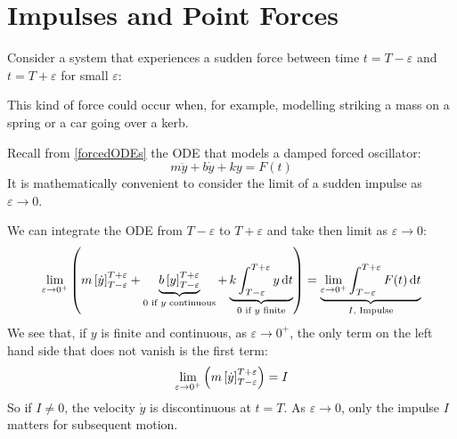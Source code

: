 \documentclass[../main.tex]{subfiles}
\begin{document}
\section{Impulses and Point Forces}
Consider a system that experiences a sudden force between time $t = T - \varepsilon$ and $t = T + \varepsilon$ for small $\varepsilon$:
\begin{center}
\end{center}
This kind of force could occur when, for example, modelling striking a mass on a spring or a car going over a kerb.
\begin{example}
  \label{impulseExample}
  Recall from \cref{forcedODEs} the ODE that models a damped forced oscillator:
  \[
    m\ddot{y} + b\dot{y} + ky = F(t)
  \]
  It is mathematically convenient to consider the limit of a sudden impulse as $\varepsilon \to 0$.

  We can integrate the ODE from $T - \varepsilon$ to $T + \varepsilon$ and take then limit as $\varepsilon \to 0$:
  \[
    \lim_{\varepsilon \to 0^{+}} \left(m \eval{\dot{y}}{T - \varepsilon}{T + \varepsilon} + \underbrace{b \eval{y}{T - \varepsilon}{T+\varepsilon}}_{0 \text{ if $y$ continuous}} + \underbrace{k \int_{T-\varepsilon}^{T+\varepsilon} y \d{t}}_{0 \text{ if $y$ finite}}\right) = \underbrace{\lim_{\varepsilon \to 0^{+}} \int_{T-\varepsilon}^{T+\varepsilon} F(t) \d{t}}_{I\text{, Impulse}}
  \]
  We see that, if $y$ is finite and continuous, as $\varepsilon \to 0^{+}$, the only term on the left hand side that does not vanish is the first term:
  \[
    \lim_{\varepsilon \to 0^{+}} \left(m \left[\dot{y}\right]_{T-\varepsilon}^{T+\varepsilon}\right) =I
  \]
  So if $I \neq 0$, the velocity $\dot{y}$ is discontinuous at $t = T$.
  As $\varepsilon \to 0$, only the impulse $I$ matters for subsequent motion.

  \begin{center}
  \end{center}
\end{example}
\end{document}
